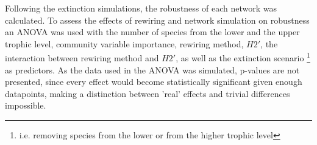 \documentclass[12pt,a4paper]{article}
\begin{document}
Following the extinction simulations, the robustness of each network was calculated. To assess the effects of rewiring and network simulation on robustness an ANOVA was used with the number of species from the lower and the upper trophic level, community variable importance, rewiring method, $H2'$, the interaction between rewiring method and $H2'$, as well as the extinction scenario \footnote{i.e. removing species from the lower or from the higher trophic level} as predictors. As the data used in the ANOVA was simulated, p-values are not presented, since every effect would become statistically significant given enough datapoints, making a distinction between 'real' effects and trivial differences impossible.

 
\end{document}

